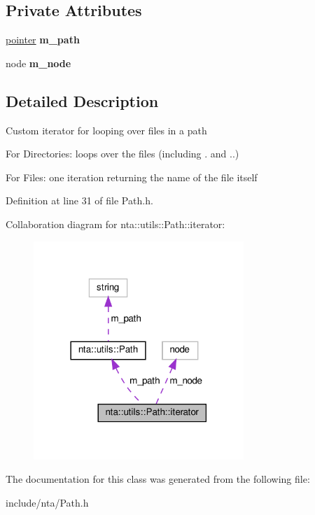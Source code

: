 \subsection*{Private Attributes}
\begin{DoxyCompactItemize}
\item 
\mbox{\label{classnta_1_1utils_1_1Path_1_1iterator_afabcec214e399d8cd3c9b9b08a872799}} 
\hyperlink{classnta_1_1utils_1_1Path}{pointer} {\bfseries m\+\_\+path}
\item 
\mbox{\label{classnta_1_1utils_1_1Path_1_1iterator_a9b7810eb2d542b99e5b7c07ed6c84723}} 
node {\bfseries m\+\_\+node}
\end{DoxyCompactItemize}


\subsection{Detailed Description}
Custom iterator for looping over files in a path

For Directories\+: loops over the files (including . and ..)

For Files\+: one iteration returning the name of the file itself 

Definition at line 31 of file Path.\+h.



Collaboration diagram for nta\+:\+:utils\+:\+:Path\+:\+:iterator\+:\nopagebreak
\begin{figure}[H]
\begin{center}
\leavevmode
\includegraphics[width=225pt]{d8/d0b/classnta_1_1utils_1_1Path_1_1iterator__coll__graph}
\end{center}
\end{figure}


The documentation for this class was generated from the following file\+:\begin{DoxyCompactItemize}
\item 
include/nta/Path.\+h\end{DoxyCompactItemize}
